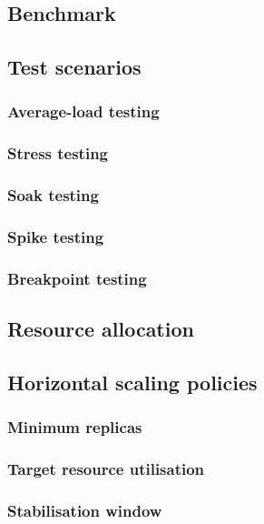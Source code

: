 \subsection{Benchmark}
\subsection{Test scenarios}
\subsubsection{Average-load testing}
\subsubsection{Stress testing}
\subsubsection{Soak testing}
\subsubsection{Spike testing}
\subsubsection{Breakpoint testing}
\subsection{Resource allocation}
\subsection{Horizontal scaling policies}
\subsubsection{Minimum replicas}
\subsubsection{Target resource utilisation}
\subsubsection{Stabilisation window}